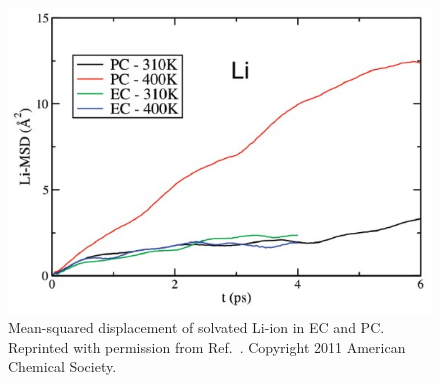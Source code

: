 \documentclass[../main.tex]{subfiles}
\begin{document}
\begin{figure}
    \centering
    \includegraphics[scale=0.5]{figures/aimdb.jpg}
    \caption{Mean-squared displacement of solvated Li-ion in EC and PC. Reprinted with permission from Ref.~. Copyright 2011 American Chemical Society.}
    \label{fig:leaimdb}
\end{figure}
\end{document}
